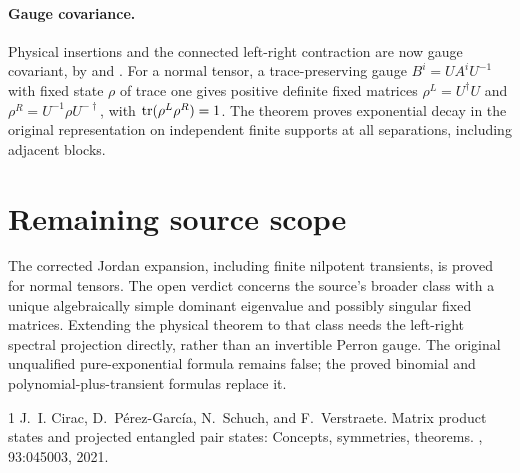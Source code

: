 \documentclass{article}
\begin{document}
\paragraph{Gauge covariance.}
Physical insertions and the connected left-right contraction are now gauge
covariant, by
 and
.
For a normal tensor, a trace-preserving gauge $B^i=UA^iU^{-1}$ with fixed
state $\rho$ of trace one gives positive definite fixed matrices
$\rho^L=U^\dagger U$ and $\rho^R=U^{-1}\rho U^{-\dagger}$, with
$\operatorname{tr}(\rho^L\rho^R)=1$. The theorem
proves exponential decay in the original representation on independent
finite supports at all separations, including adjacent blocks.

\section{Remaining source scope}

The corrected Jordan expansion, including finite nilpotent transients, is
proved for normal tensors. The open verdict concerns the source's broader
class with a unique algebraically simple dominant eigenvalue and possibly
singular fixed matrices. Extending the physical theorem to that class needs
the left-right spectral projection directly, rather than an invertible
Perron gauge. The original unqualified pure-exponential formula remains
false; the proved binomial and polynomial-plus-transient formulas replace it.

\begin{thebibliography}{1}
    J.~I. Cirac, D.~P\'erez-Garc\'ia, N.~Schuch, and F.~Verstraete.
    \newblock Matrix product states and projected entangled pair states: Concepts, symmetries, theorems.
    , 93:045003, 2021.
\end{thebibliography}
\end{document}
